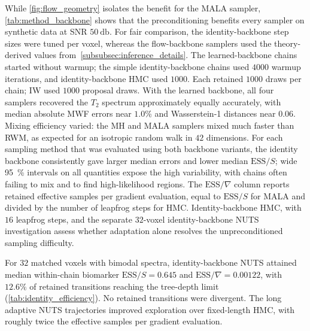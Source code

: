 While \cref{fig:flow_geometry} isolates the benefit for the \gls*{MALA} sampler, \cref{tab:method_backbone} shows that the preconditioning benefits every sampler on synthetic data at \gls*{SNR} $\SI{50}{\decibel}$.
For fair comparison, the identity-backbone step sizes were tuned per voxel, whereas the flow-backbone samplers used the theory-derived values from~\cref{subsubsec:inference_details}.
The learned-backbone chains started without warmup;
the simple identity-backbone chains used $\num{4000}$ warmup iterations, and identity-backbone \gls*{HMC} used $\num{1000}$.
Each retained $\num{1000}$ draws per chain;
\gls*{IW} used $\num{1000}$ proposal draws.
With the learned backbone, all four samplers recovered the $T_2$ spectrum approximately equally accurately, with median absolute \gls*{MWF} errors near $1.0$\% and Wasserstein-1 distances near $0.06$.
Mixing efficiency varied:
the \gls*{MH} and \gls*{MALA} samplers mixed much faster than \gls*{RWM}, as expected for an isotropic random walk in $\num{42}$ dimensions.
For each sampling method that was evaluated using both backbone variants, the identity backbone consistently gave larger median errors and lower median $\mathrm{ESS} / S$;
wide \SI{95}{\percent} intervals on all quantities expose the high variability, with chains often failing to mix and to find high-likelihood regions.
The $\mathrm{ESS} / \nabla$ column reports retained effective samples per gradient evaluation, equal to $\mathrm{ESS}/S$ for \gls*{MALA} and divided by the number of leapfrog steps for \gls*{HMC}.
Identity-backbone \gls*{HMC}, with $16$ leapfrog steps, and the separate $32$-voxel identity-backbone \gls*{NUTS} investigation assess whether adaptation alone resolves the unpreconditioned sampling difficulty.

For $32$ matched voxels with bimodal spectra, identity-backbone \gls*{NUTS} attained median within-chain biomarker $\mathrm{ESS}/S=0.645$ and $\mathrm{ESS} / \nabla=0.00122$, with $12.6\%$ of retained transitions reaching the tree-depth limit (\cref{tab:identity_efficiency}).
No retained transitions were divergent.
The long adaptive \gls*{NUTS} trajectories improved exploration over fixed-length \gls*{HMC}, with roughly twice the effective samples per gradient evaluation.

\begin{table}[htbp]
    \centering
    \caption{Identity-backbone efficiency investigation on the first $32$ voxels of the matched $\SI{50}{\decibel}$ bimodal cohort.
        Values are medians of within-chain biomarker diagnostics over voxels, with $\num{1000}$ retained draws per voxel.
        \gls*{MALA} uses $\num{4000}$ warmup iterations, and \gls*{HMC} and \gls*{NUTS} use $\num{1000}$.
        \gls*{HMC} uses $16$ leapfrog steps;
        \gls*{NUTS} adapts its trajectory length with maximum tree depth $10$.
        These single-chain diagnostics do not establish between-chain convergence.}
    \label{tab:identity_efficiency}
    
\end{table}

